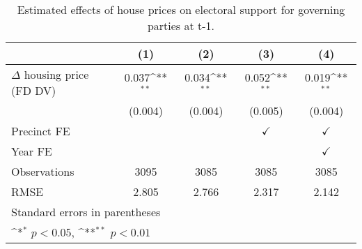 \begin{table}[htbp]\centering
\def\sym#1{\ifmmode^{#1}\else\(^{#1}\)\fi}
\caption{Estimated effects of house prices on electoral support for governing parties at t-1.} \label{prelagdv}
\begin{tabular}{l*{4}{c}}
\hline\hline
                    &\multicolumn{1}{c}{(1)}        &\multicolumn{1}{c}{(2)}        &\multicolumn{1}{c}{(3)}        &\multicolumn{1}{c}{(4)}        \\
\hline
$\Delta$ housing price (FD DV)&       0.037\sym{**}&       0.034\sym{**}&       0.052\sym{**}&       0.019\sym{**}\\
                    &     (0.004)        &     (0.004)        &     (0.005)        &     (0.004)        \\
[1em]
\hline Precinct FE  &                    &                    &$\checkmark$        &$\checkmark$        \\
[1em]
Year FE             &                    &                    &                    &$\checkmark$        \\
\hline
Observations        &        3095        &        3085        &        3085        &        3085        \\
RMSE                &       2.805        &       2.766        &       2.317        &       2.142        \\
\hline\hline
\multicolumn{5}{l}{\footnotesize Standard errors in parentheses}\\
\multicolumn{5}{l}{\footnotesize \sym{*} \(p<0.05\), \sym{**} \(p<0.01\)}\\
\end{tabular}
\end{table}
